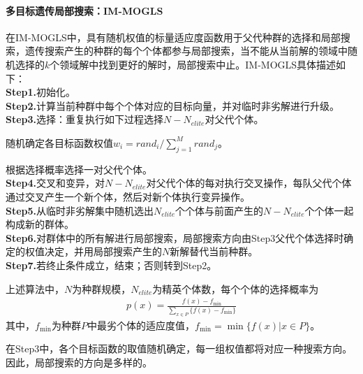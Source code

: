            \paragraph{多目标遗传局部搜索：IM-MOGLS}
            在IM-MOGLS中，具有随机权值的标量适应度函数用于父代种群的选择和局部搜索，遗传搜索产生的种群的每个个体都参与局部搜索，当不能从当前解的领域中随机选择的$k$个领域解中找到更好的解时，局部搜索中止。IM-MOGLS具体描述如下：\\
            \textbf{Step1.}初始化。\\
            \textbf{Step2.}计算当前种群中每个个体对应的目标向量，并对临时非劣解进行升级。\\
            \textbf{Step3.}选择：重复执行如下过程选择$N-N_{elite}$对父代个体。
            \par
            随机确定各目标函数权值$w_i=rand_i/{\mathop{\sum}\limits_{j=1}^Mrand_j}$。
            \par
            根据选择概率选择一对父代个体。\\
            \textbf{Step4.}交叉和变异，对$N-N_{elite}$对父代个体的每对执行交叉操作，每队父代个体通过交叉产生一个新个体，然后对新个体执行变异操作。\\
            \textbf{Step5.}从临时非劣解集中随机选出$N_{elite}$个个体与前面产生的$N-N_{elite}$个个体一起构成新的群体。\\
            \textbf{Step6.}对群体中的所有解进行局部搜索，局部搜索方向由Step3父代个体选择时确定的权值决定，并用局部搜索产生的$N$新解替代当前种群。\\
            \textbf{Step7.}若终止条件成立，结束；否则转到Step2。
            \par
            上述算法中，$N$为种群规模，$N_{elite}$为精英个体数，每个个体的选择概率为
                \begin{align}
                  p(x) = \frac{f(x)-f_{\min}}{\mathop{\sum}\limits_{x\in P}\{f(x)-f_{\min}\}}
                \end{align}
            其中，$f_{\min}$为种群$P$中最劣个体的适应度值，$f_{\min}=\min\{f(x)|x\in P\}$。
            \par
            在Step3中，各个目标函数的取值随机确定，每一组权值都将对应一种搜索方向。因此，局部搜索的方向是多样的。
